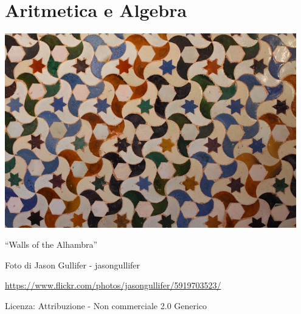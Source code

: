\part{Aritmetica e Algebra}

\includegraphics[width=0.95\textwidth]{img/alhambra.jpg}
  \begin{center}
    {\large ``Walls of the Alhambra''}\par
    Foto di Jason Gullifer - jasongullifer\par
    \url{https://www.flickr.com/photos/jasongullifer/5919703523/}\par
    Licenza: Attribuzione - Non commerciale 2.0 Generico\par
  \end{center}
\clearpage
\cleardoublepage
